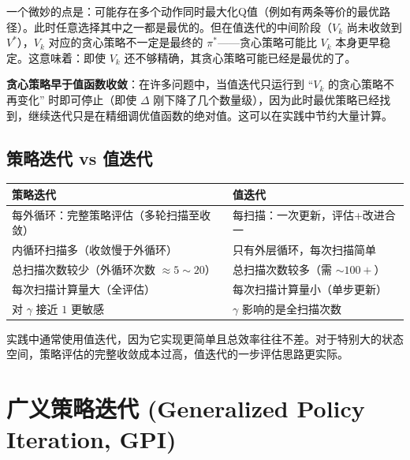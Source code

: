 一个微妙的点是：可能存在多个动作同时最大化Q值（例如有两条等价的最优路径）。此时任意选择其中之一都是最优的。但在值迭代的中间阶段（$V_k$ 尚未收敛到 $V^{*}$），$V_k$ 对应的贪心策略不一定是最终的 $\pi^{*}$——贪心策略可能比 $V_k$ 本身更早稳定。这意味着：即使 $V_k$ 还不够精确，其贪心策略可能已经是最优的了。

\begin{remark}
\textbf{贪心策略早于值函数收敛}：在许多问题中，当值迭代只运行到 ``$V_k$ 的贪心策略不再变化'' 时即可停止（即使 $\Delta$ 刚下降了几个数量级），因为此时最优策略已经找到，继续迭代只是在精细调优值函数的绝对值。这可以在实践中节约大量计算。
\end{remark}

\subsection{策略迭代 vs 值迭代}

\begin{center}
\begin{tabular}{p{5cm} p{5cm}}
\hline
\textbf{策略迭代} & \textbf{值迭代} \\
\hline
每外循环：完整策略评估（多轮扫描至收敛） & 每扫描：一次更新，评估+改进合一 \\
内循环扫描多（收敛慢于外循环） & 只有外层循环，每次扫描简单 \\
总扫描次数较少（外循环次数 $\approx 5\sim20$） & 总扫描次数较多（需 $\sim 100+$） \\
每次扫描计算量大（全评估） & 每次扫描计算量小（单步更新） \\
对 $\gamma$ 接近 $1$ 更敏感 & $\gamma$ 影响的是全扫描次数 \\
\hline
\end{tabular}
\end{center}

实践中通常使用值迭代，因为它实现更简单且总效率往往不差。对于特别大的状态空间，策略评估的完整收敛成本过高，值迭代的一步评估思路更实际。

\section{广义策略迭代 (Generalized Policy Iteration, GPI)}

